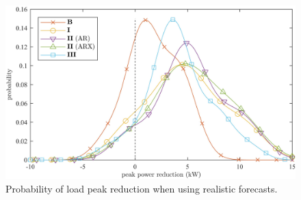 \begin{figure}[htb]\centering
	\includegraphics[width=\linewidth]{_chapter2/fig/difference-pdf-1-avg}
	\caption{Probability of load peak reduction when using realistic forecasts.}
	\label{ch2:fig:peak-diff-pdf}
\end{figure}